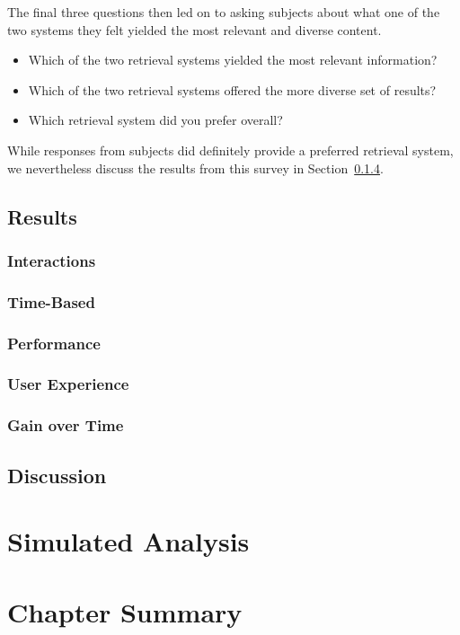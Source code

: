 The final three questions then led on to asking subjects about what one of the two systems they felt yielded the most relevant and diverse content.

\begin{itemize}
    \item{ Which of the two retrieval systems yielded the most relevant information?}
    \item{ Which of the two retrieval systems offered the more diverse set of results?}
    \item{ Which retrieval system did you prefer overall?}
\end{itemize}

While responses from subjects did definitely provide a preferred retrieval system, we nevertheless discuss the results from this survey in Section~\ref{sec:diversity:users:results:experience}.

\subsection{Results}

\subsubsection{Interactions}

\subsubsection{Time-Based}

\subsubsection{Performance}

\subsubsection{User Experience}\label{sec:diversity:users:results:experience}

\subsubsection{Gain over Time}

\subsection{Discussion}

\section{Simulated Analysis}\label{sec:diversity:simulated}

\section{Chapter Summary}